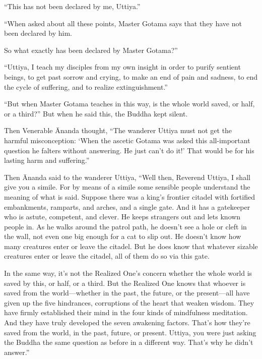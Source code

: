 \documentclass[12pt,openany]{book}%
\begin{document}
“This has not been declared by me, Uttiya.” 

“When asked about all these points, Master Gotama says that they have not been declared by him. 

So what exactly has been declared by Master Gotama?” 

“Uttiya, I teach my disciples from my own insight in order to purify sentient beings, to get past sorrow and crying, to make an end of pain and sadness, to end the cycle of suffering, and to realize extinguishment.” 

“But when Master Gotama teaches in this way, is the whole world saved, or half, or a third?” But when he said this, the Buddha kept silent. 

Then Venerable Ānanda thought, “The wanderer Uttiya must not get the harmful misconception: ‘When the ascetic Gotama was asked this all-important question he falters without answering. He just can’t do it!’ That would be for his lasting harm and suffering.” 

Then Ānanda said to the wanderer Uttiya, “Well then, Reverend Uttiya, I shall give you a simile. For by means of a simile some sensible people understand the meaning of what is said. Suppose there was a king’s frontier citadel with fortified embankments, ramparts, and arches, and a single gate. And it has a gatekeeper who is astute, competent, and clever. He keeps strangers out and lets known people in. As he walks around the patrol path, he doesn’t see a hole or cleft in the wall, not even one big enough for a cat to slip out. He doesn’t know how many creatures enter or leave the citadel. But he does know that whatever sizable creatures enter or leave the citadel, all of them do so via this gate. 

In the same way, it’s not the Realized One’s concern whether the whole world is saved by this, or half, or a third. But the Realized One knows that whoever is saved from the world—whether in the past, the future, or the present—all have given up the five hindrances, corruptions of the heart that weaken wisdom. They have firmly established their mind in the four kinds of mindfulness meditation. And they have truly developed the seven awakening factors. That’s how they’re saved from the world, in the past, future, or present. Uttiya, you were just asking the Buddha the same question as before in a different way. That’s why he didn’t answer.” 
\end{document}
